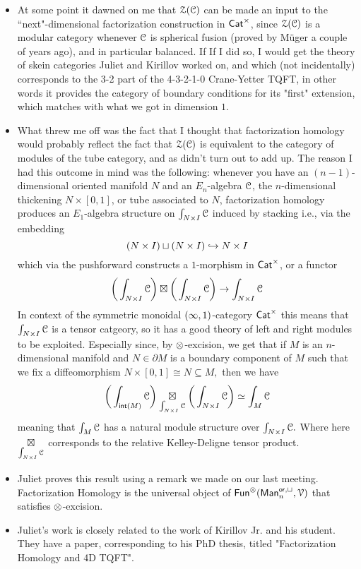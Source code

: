 \begin{itemize}
    \item At some point it dawned on me that $\mathcal Z(\mathcal C)$ can be made an input to the ``next"-dimensional factorization construction in $\operatorname{{\sf Cat}}^\times$, since $\mathcal Z(\mathcal C)$ is a modular category whenever $\mathcal C$ is spherical fusion (proved by M\"uger a couple of years ago), and in particular balanced. If If I did so, I would get the theory of skein categories Juliet and Kirillov worked on, and which (not incidentally) corresponds to the 3-2 part of the 4-3-2-1-0 Crane-Yetter TQFT, in other words it provides the category of boundary conditions for its "first" extension, which matches with what we got in dimension $1$.
    \item What threw me off was the fact that I thought that factorization homology would probably reflect the fact that $\mathcal Z(\mathcal C)$ is equivalent to the category of modules of the tube category, and as didn't turn out to add up. The reason I had this outcome in mind was the following: whenever you have an $(n-1)$-dimensional oriented manifold $N$ and an $E_n$-algebra $\mathcal C$, the $n$-dimensional thickening $N\times [0,1]$, or tube associated to $N$, factorization homology produces an $E_1$-algebra structure on $\int_{N\times I}\mathcal C$ induced by stacking i.e., via the embedding $$(N\times I)\sqcup (N\times I) \hookrightarrow N\times I$$ which via the pushforward constructs a $1$-morphism in $\operatorname{{\sf Cat}}^\times$, or a functor \[\bigg(\int_{N\times I}\mathcal C\bigg)\boxtimes \bigg(\int_{N\times I}\mathcal C\bigg) \rightarrow \int_{N\times I}\mathcal C\] In context of the symmetric monoidal $(\operatorname{\infty},1)$-category $\operatorname{{\sf Cat}}^\times$ this means that $\int_{N\times I}\mathcal C$ is a tensor catgeory, so it has a good theory of left and right modules to be exploited. Especially since, by $\otimes$-excision, we get that if $M$ is an $n$-dimensional manifold and $N\in \partial M$ is a boundary component of $M$ such that we fix a diffeomorphism $N\times [0,1]\cong N\subseteq M,$ then we have \[\bigg(\int_{{\sf int}(M)}\mathcal C\bigg)\underset{\int_{N\times I}\mathcal C}{\boxtimes}\bigg(\int_{N\times I}\mathcal C\bigg)\simeq \int_{M}\mathcal C\] meaning that $\int_M \mathcal C$ has a natural module structure over $\int_{N\times I}\mathcal C.$ Where here $\underset{\int_{N\times I}\mathcal C}{\boxtimes}$ corresponds to the relative Kelley-Deligne tensor product.
    \item Juliet proves this result using a remark we made on our last meeting. Factorization Homology is the universal object of $\operatorname{{\sf Fun}}^\otimes(\operatorname{\sf Man}^{\operatorname{\mathsf{or}} ,\sqcup}_n, \mathcal V)$ that satisfies $\otimes$-excision.
    \item Juliet's work is closely related to the work of Kirillov Jr. and his student. They have a paper, corresponding to his PhD thesis, titled "Factorization Homology and 4D TQFT".
\end{itemize}

